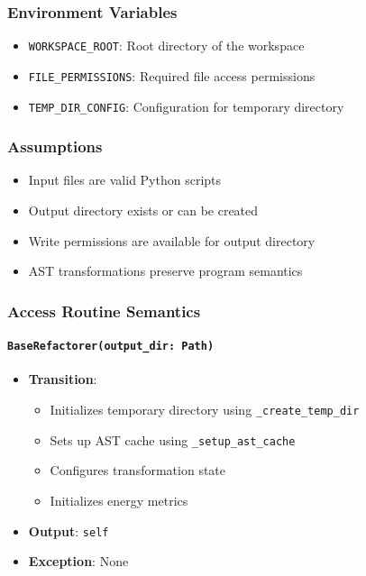 \documentclass[12pt, titlepage]{article}
\begin{document}
\subsubsection{Environment Variables}
\begin{itemize}
  \item \texttt{WORKSPACE\_ROOT}: Root directory of the workspace
  \item \texttt{FILE\_PERMISSIONS}: Required file access permissions
  \item \texttt{TEMP\_DIR\_CONFIG}: Configuration for temporary directory
\end{itemize}

\subsubsection{Assumptions}
\begin{itemize}
  \item Input files are valid Python scripts
  \item Output directory exists or can be created
  \item Write permissions are available for output directory
  \item AST transformations preserve program semantics
\end{itemize}

\subsubsection{Access Routine Semantics}

\paragraph{\texttt{BaseRefactorer(output\_dir: Path)}}
\begin{itemize}
  \item \textbf{Transition}: 
    \begin{itemize}
      \item Initializes temporary directory using \texttt{\_create\_temp\_dir}
      \item Sets up AST cache using \texttt{\_setup\_ast\_cache}
      \item Configures transformation state
      \item Initializes energy metrics
    \end{itemize}
  \item \textbf{Output}: \texttt{self}
  \item \textbf{Exception}: None
\end{itemize}
\end{document}
